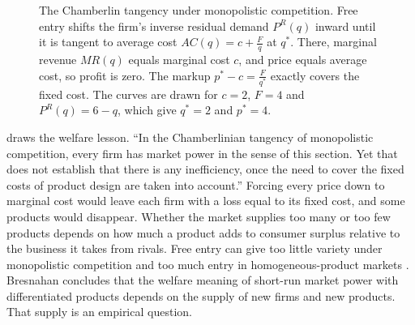 \begin{figure}[htbp]
\centering
{}
\caption{The Chamberlin tangency under monopolistic competition. Free entry shifts the firm's inverse residual
demand $P^R(q)$ inward until it is tangent to average cost $AC(q) = c + \frac{F}{q}$ at $q^*$. There, marginal
revenue $MR(q)$ equals marginal cost $c$, and price equals average cost, so profit is zero. The markup
$p^* - c = \frac{F}{q^*}$ exactly covers the fixed cost. The curves are drawn for $c = 2$, $F = 4$ and
$P^R(q) = 6 - q$, which give $q^* = 2$ and $p^* = 4$.}
\label{fig:01-tangency}
\end{figure}

\citet[p.~1050]{Bresnahan1989} draws the welfare lesson. ``In the Chamberlinian tangency of monopolistic
competition, every firm has market power in the sense of this section. Yet that does not establish that there is
any inefficiency, once the need to cover the fixed costs of product design are taken into account.'' Forcing
every price down to marginal cost would leave each firm with a loss equal to its fixed cost, and some products
would disappear. Whether the market supplies too many or too few products depends on how much a product adds to
consumer surplus relative to the business it takes from rivals. Free entry can give too little variety under
monopolistic competition and too much entry in homogeneous-product markets \citep[see][and the work they
cite]{MankiwWhinston1986}. Bresnahan concludes that the welfare meaning of short-run market power with
differentiated products depends on the supply of new firms and new products. That supply is an empirical
question.

